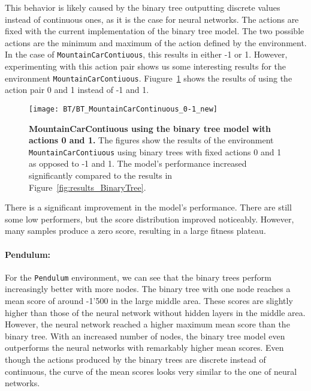 This behavior is likely caused by the binary tree outputting discrete values instead of continuous ones, as it is the case for neural networks. The actions are fixed with the current implementation of the binary tree model. The two possible actions are the minimum and maximum of the action defined by the environment. In the case of \verb|MountainCarContiuous|, this results in either -1 or 1. However, experimenting with this action pair shows us some interesting results for the environment \verb|MountainCarContiuous|. Fiugure~\ref{fig:binary_tree_mountain_car_continuous} shows the results of using the action pair 0 and 1 instead of -1 and 1.
\begin{figure}[ht]
\centering
\texttt{[image: BT/BT\_MountainCarContinuous\_0-1\_new]}
\caption[MountainCarContiuous using the binary tree model with actions 0 and 1]{
  \textbf{MountainCarContiuous using the binary tree model with actions 0 and 1.}
  The figures show the results of the environment \texttt{MountainCarContiuous} using binary trees with fixed actions 0 and 1 as opposed to -1 and 1. The model's performance increased significantly compared to the results in Figure~\ref{fig:results_BinaryTree}.
}
\label{fig:binary_tree_mountain_car_continuous}
\end{figure}
There is a significant improvement in the model's performance. There are still some low performers, but the score distribution improved noticeably. However, many samples produce a zero score, resulting in a large fitness plateau.

\paragraph*{Pendulum:} For the \verb|Pendulum| environment, we can see that the binary trees perform increasingly better with more nodes. The binary tree with one node reaches a mean score of around -1'500 in the large middle area. These scores are slightly higher than those of the neural network without hidden layers in the middle area. However, the neural network reached a higher maximum mean score than the binary tree. With an increased number of nodes, the binary tree model even outperforms the neural networks with remarkably higher mean scores. Even though the actions produced by the binary trees are discrete instead of continuous, the curve of the mean scores looks very similar to the one of neural networks.

